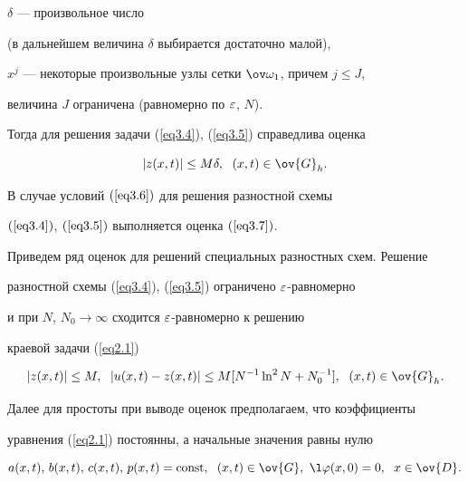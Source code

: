 $\delta$ --- произвольное число


(в дальнейшем величина $\delta$ выбирается достаточно малой),


$x^j$ --- некоторые произвольные узлы сетки $\ovo_1$, причем $j\le J$,


величина $J$ ограничена (равномерно по $\varepsilon$, $N$).


Тогда для решения задачи (\ref{eq3.4}), (\ref{eq3.5}) справедлива оценка


\begin{equation}


\label{eq3.7}


|z(x,t)|\le M\delta,\ \; (x,t)\in\ov{G}_h.


\end{equation}





\begin{lems}


В случае условий $(\ref{eq3.6})$ для решения разностной схемы


$(\ref{eq3.4})$, $(\ref{eq3.5})$ выполняется оценка $(\ref{eq3.7})$.


\end{lems}





Приведем ряд оценок для решений специальных разностных схем. Решение


разностной схемы (\ref{eq3.4}), (\ref{eq3.5}) ограничено $\varepsilon$-равномерно


и при $N$, $N_0\to \infty$ сходится $\varepsilon$-равномерно к решению


краевой задачи (\ref{eq2.1})


\begin{equation}


\label{eq3.8}


|z(x,t)|\le M,\ \; |u(x,t)-z(x,t)|\le


M[N^{-1}\ln^2 N+N_0^{-1}],\ \; (x,t)\in\ov{G}_h.


\end{equation}





Далее для простоты при выводе оценок предполагаем, что коэффициенты


уравнения (\ref{eq2.1}) постоянны, а начальные значения равны нулю


\begin{equation}


\label{eq3.9}


a(x,t),\, b(x,t),\, c(x,t),\, p(x,t)=\const,\ \; (x,t)\in\ov{G},


\ \l  \f(x,0)=0,\ \; x\in\ov{D}.


\end{equation}






